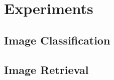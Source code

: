 
\lhead[\chaptername~\thechapter]{\rightmark}

\rhead[\leftmark]{}

\lfoot[\thepage]{}

\cfoot{}

\rfoot[]{\thepage}

\chapter{Experiments\label{experiments}}

\section{Image Classification}

\section{Image Retrieval}





